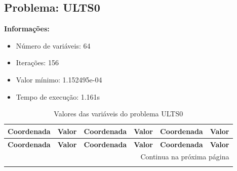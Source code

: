 \documentclass[12pt]{article}
\begin{document}
\newpage            
\subsection{Problema: ULTS0}

\textbf{Informações:}
\begin{itemize}
\item Número de variáveis: 64
\item Iterações: 156
\item Valor mínimo: 1.152495e-04
\item Tempo de execução: 1.161s
\end{itemize}

\small
\begin{longtable}{@{}cc|cc|cc@{}}
\caption{Valores das variáveis do problema ULTS0} \\
\toprule
\textbf{Coordenada} & \textbf{Valor} & \textbf{Coordenada} & \textbf{Valor} & \textbf{Coordenada} & \textbf{Valor} \\
\midrule
\endfirsthead

\toprule
\textbf{Coordenada} & \textbf{Valor} & \textbf{Coordenada} & \textbf{Valor} & \textbf{Coordenada} & \textbf{Valor} \\
\midrule
\endhead

\midrule \multicolumn{6}{r}{{Continua na próxima página}} \\ \midrule
\endfoot


\end{longtable}
\end{document}

